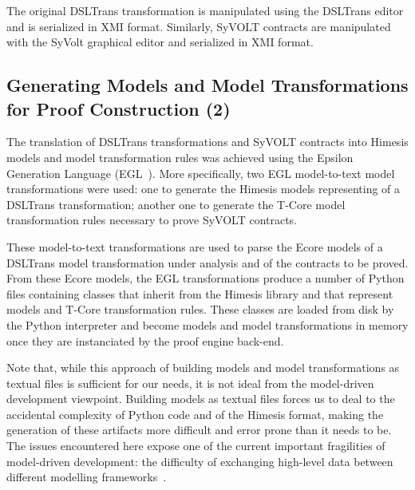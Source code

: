The original DSLTrans transformation is manipulated using the DSLTrans editor
and is serialized in XMI format. Similarly, SyVOLT contracts are manipulated with the SyVolt graphical
editor and serialized in XMI format.


\subsection{Generating Models and Model Transformations for Proof Construction
(2)}
\label{sec:gen_models_mt}

The translation of DSLTrans transformations and SyVOLT contracts into Himesis
models and model transformation rules was achieved using the Epsilon Generation
Language (EGL~\cite{Rose2008}). More specifically, two EGL model-to-text model
transformations were used: one to generate the Himesis models
representing of a DSLTrans transformation; another one to generate the T-Core
model transformation rules necessary to prove SyVOLT contracts.

These model-to-text transformations are used to parse the Ecore models of a
DSLTrans model transformation under analysis and of the contracts to be proved.
From these Ecore models, the EGL transformations produce a number of Python
files containing classes that inherit from the Himesis library and that
represent models and T-Core transformation rules. These classes are loaded from
disk by the Python interpreter and become models and model transformations in
memory once they are instanciated by the proof engine back-end.

Note that, while this approach of building models and model transformations as
textual files is sufficient for our needs, it is not ideal from the model-driven
development viewpoint. Building models as textual files forces us to deal to
the accidental complexity of Python code and of the Himesis format, making the
generation of these artifacts more difficult and error prone than it needs to
be. The issues encountered here expose one of the current important fragilities
of model-driven development: the difficulty of exchanging high-level data
between different modelling frameworks~.



